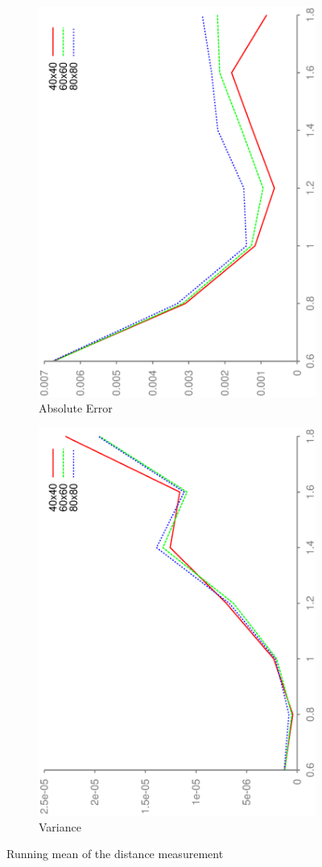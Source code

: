 \documentclass[DIV12,a4paper]{scrartcl}
\begin{document}
\begin{figure}[h!tbp]
  \centering
  \begin{subfigure}[b]{.5\textwidth}
    \centering
    \includegraphics[height=\textwidth, angle=270]{figures/mean_mean10_error.eps}
    \caption{Absolute Error}
  \end{subfigure}%
  \begin{subfigure}[b]{.5\textwidth}
    \centering
    \includegraphics[height=\textwidth, angle=270]{figures/mean_mean10_variance.eps}
    \caption{Variance}
  \end{subfigure}
  \caption{Running mean of the distance measurement}
  \label{fig:mean10_noise}
\end{figure}
\end{document}
